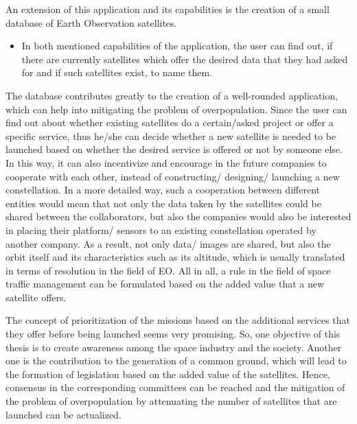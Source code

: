 An extension of this application and its capabilities is the creation of a small database of Earth Observation satellites.

\begin{itemize}
\item In both mentioned capabilities of the application, the user can find out, if there are currently satellites which offer the desired data that they had asked for and if such satellites exist, to name them.
\end{itemize}

The database contributes greatly to the creation of a well-rounded application, which can help into mitigating the problem of overpopulation. Since the user can find out about whether existing satellites do a certain/asked project or offer a specific service, thus he/she can decide whether a new satellite is needed to be launched based on whether the desired service is offered or not by someone else. In this way, it can also incentivize and encourage in the future companies to cooperate with each other, instead of constructing/ designing/ launching a new constellation. In a more detailed way, such a cooperation between different entities would mean that not only the data taken by the satellites could be shared between the collaborators, but also the companies would also be interested in placing their platform/ sensors to an existing constellation operated by another company. As a result, not only data/ images are shared, but also the orbit itself and its characteristics such as its altitude, which is usually translated in terms of resolution in the field of EO. All in all, a rule in the field of space traffic management can be formulated based on the added value that a new satellite offers.

The concept of prioritization of the missions based on the additional services that they offer before being launched seems very promising. So, one objective of this thesis is to create awareness among the space industry and the society. Another one is the contribution to the generation of a common ground, which will lead to the formation of legislation based on the added value of the satellites. Hence, consensus in the corresponding committees can be reached and the mitigation of the problem of overpopulation by attenuating the number of satellites that are launched can be actualized.


